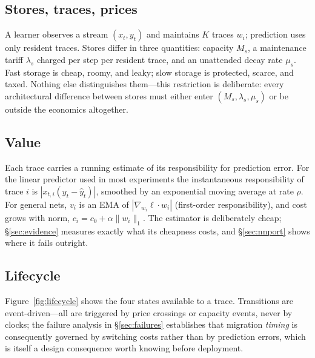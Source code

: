 \documentclass[10pt,twocolumn]{article}
\theoremstyle{definition}
\begin{document}
\subsection{Stores, traces, prices}
A learner observes a stream $(x_t,y_t)$ and maintains $K$ traces $w_i$; prediction uses only resident
traces. Stores differ in three quantities: capacity $M_s$, a maintenance tariff $\lambda_s$ charged per step
per resident trace, and an unattended decay rate $\mu_s$. Fast storage is cheap, roomy, and leaky; slow
storage is protected, scarce, and taxed. Nothing else distinguishes them---this restriction is deliberate:
every architectural difference between stores must either enter $(M_s,\lambda_s,\mu_s)$ or be outside the
economics altogether.

\subsection{Value}
Each trace carries a running estimate of its responsibility for prediction error. For the linear predictor
used in most experiments the instantaneous responsibility of trace $i$ is $|x_{t,i}(y_t-\hat y_t)|$,
smoothed by an exponential moving average at rate $\rho$. For general nets, $v_i$ is an {EMA} of
$|\nabla_{w_i}\ell\cdot w_i|$ (first-order responsibility), and cost grows with norm,
$c_i=c_0+\alpha\|w_i\|_1$. The estimator is deliberately cheap; \S\ref{sec:evidence} measures exactly what
its cheapness costs, and \S\ref{sec:nnport} shows where it fails outright.

\subsection{Lifecycle}
Figure~\ref{fig:lifecycle} shows the four states available to a trace. Transitions are event-driven---all are
triggered by price crossings or capacity events, never by clocks; the failure analysis in
\S\ref{sec:failures} establishes that migration \emph{timing} is consequently governed by switching costs
rather than by prediction errors, which is itself a design consequence worth knowing before deployment.
\end{document}
